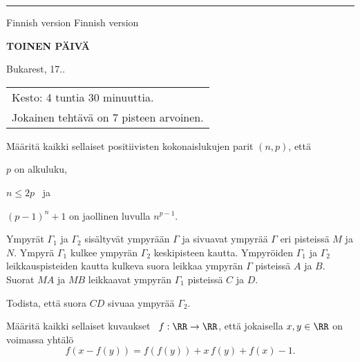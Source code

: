 
\textheight 9in
\textwidth 6in
\hoffset -0.4in
\voffset -1in
\setlength{\headsep}{2cm}
\pagestyle{empty}


%


\hrule
\medskip
Finnish version \hspace{8.2cm} Finnish version
\bigskip
\bigskip


\centerline{\large \bf TOINEN P\"AIV\"A}
\medskip
\centerline{\large Bukarest, 17..}
\bigskip
\bigskip

\hspace{8.5cm}\begin{tabular}{l}
Kesto: 4 tuntia 30 minuuttia.\\
Jokainen teht\"av\"a on  7 pisteen arvoinen.
\end{tabular}
\vspace{2cm}

\bigskip

\noindent M\"a\"arit\"a kaikki sellaiset positiivisten kokonaislukujen
parit $(n,p)$, ett\"a

\smallskip

\indent \indent $p$ on alkuluku,

\smallskip

\indent\indent $n\leq 2p$ \ ja

\smallskip

\indent\indent $(p-1)^n + 1$ on jaollinen luvulla $n^{p-1}$.

\bigskip
\bigskip
{}
\bigskip

\noindent Ympyr\"at $\Gamma_1$ ja $\Gamma_2$ sis\"altyv\"at
ympyr\"a\"an $\Gamma$ ja sivuavat ympyr\"a\"a $\Gamma$
eri pisteiss\"a $M$ ja $N$. Ympyr\"a
$\Gamma_1$ kulkee ympyr\"an $\Gamma_2$ keskipisteen
kautta. Ympyr\"oiden $\Gamma_1$ ja
$\Gamma_2$ leikkauspisteiden kautta kulkeva suora leikkaa 
ympyr\"an $\Gamma$ pisteiss\"a $A$ ja $B$. 
Suorat $MA$ ja $MB$ leikkaavat ympyr\"an $\Gamma_1$
pisteiss\"a $C$ ja $D$.

\smallskip
\noindent Todista, ett\"a suora $CD$ sivuaa ympyr\"a\"a $\Gamma_2$.

\bigskip
\bigskip

\bigskip

\noindent M\"a\"arit\"a kaikki sellaiset kuvaukset \
$f:\RR \to \RR$, ett\"a jokaisella
$x,y\in\RR$ on voimassa yht\"al\"o
\[
f(x-f(y))=f(f(y)) + x\,f(y)+f(x)-1.
\]


